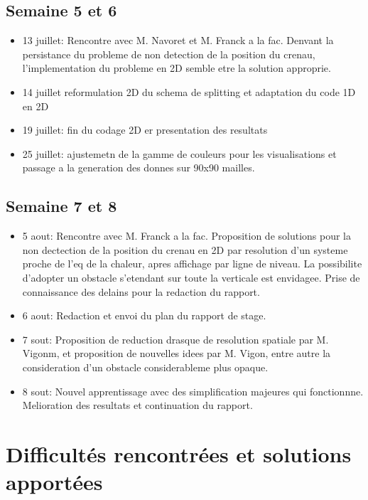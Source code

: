 \subsection{Semaine 5 et 6}

\begin{itemize}
 \item 13 juillet: Rencontre avec M. Navoret et M. Franck a la fac. Denvant la persistance du probleme de non detection de la position du crenau, l'implementation du probleme en 2D semble etre la solution approprie.
 \item 14 juillet reformulation 2D du schema de splitting et adaptation du code 1D en 2D
 \item 19 juillet: fin du codage 2D  er presentation des resultats
 \item 25 juillet: ajustemetn de la gamme de couleurs pour les visualisations et passage a la generation des donnes sur 90x90 mailles.
\end{itemize}

\subsection{Semaine 7 et 8}
\begin{itemize}
 \item 5 aout: Rencontre avec M. Franck a la fac. Proposition de solutions pour la non dectection de la position du crenau en 2D par resolution d'un systeme proche de l'eq de la chaleur, apres affichage par ligne de niveau. La possibilite d'adopter un obstacle s'etendant sur toute la verticale est envidagee. Prise de connaissance des delains pour la redaction du rapport.
 \item 6 aout: Redaction et envoi du plan du rapport de stage. 
 \item 7 sout: Proposition de reduction drasque de resolution spatiale par M. Vigonm, et proposition de nouvelles idees par M. Vigon, entre autre la consideration d'un obstacle considerableme plus opaque.
 \item 8 sout: Nouvel apprentissage avec des simplification majeures qui fonctionnne. Melioration des resultats et continuation du rapport.
\end{itemize}

\section{Difficultés rencontrées et solutions apportées}

